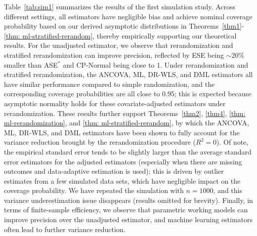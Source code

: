 \documentclass[12pt]{article}
\begin{document}
{Table~\ref{tab:sim1} summarizes the results of the first simulation study. Across different settings, all estimators have negligible bias and achieve nominal coverage probability based on our derived asymptotic distributions in Theorems~\ref{thm1}-\ref{thm: ml-stratified-rerandom}, thereby empirically supporting our theoretical results. For the unadjusted estimator, we observe that rerandomization and stratified rerandomization can improve precision, reflected by ESE being $\sim 20\%$ smaller than ASE$^*$ and CP-Normal being close to 1. Under rerandomization and stratified rerandomization, the ANCOVA, ML, DR-WLS, and DML estimators all have similar performance compared to simple randomization, and the corresponding coverage probabilities are all close to 0.95; this is expected because asymptotic normality holds for these covariate-adjusted estimators under rerandomization. These results further support Theorems~\ref{thm2}, \ref{thm4}, \ref{thm: ml-rerandomization}, and \ref{thm: ml-stratified-rerandom}, by which the ANCOVA, ML, DR-WLS, and DML estimators have been shown to fully account for the variance reduction brought by the rerandomization procedure ($R^2=0$). Of note, the empirical standard error tends to be slightly larger than the average standard error estimators for the adjusted estimators (especially when there are missing outcomes and data-adaptive estimation is used); this is driven by outlier estimates from a few simulated data sets, which have negligible impact on the coverage probability. We have repeated the simulation with $n=1000$, and this variance underestimation issue disappears (results omitted for brevity). Finally, in terms of finite-sample efficiency, we observe that parametric working models can improve precision over the unadjusted estimator, and machine learning estimators often lead to further variance reduction.

}
\end{document}
